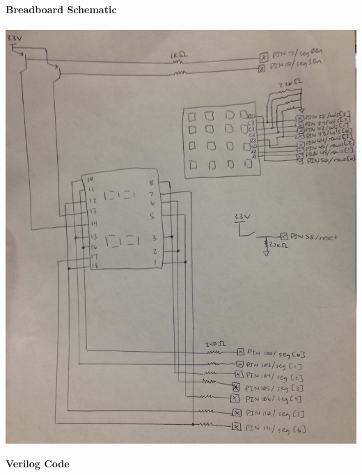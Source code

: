 \documentclass[11pt,letterpaper]{article}
\begin{document}
\pagebreak

\noindent\textbf{Breadboard Schematic}\\\\
\includegraphics[scale=0.2]{lab3schematic}

\pagebreak

\noindent\textbf{Verilog Code}\\
\lstset{language=Verilog}

\end{document}
